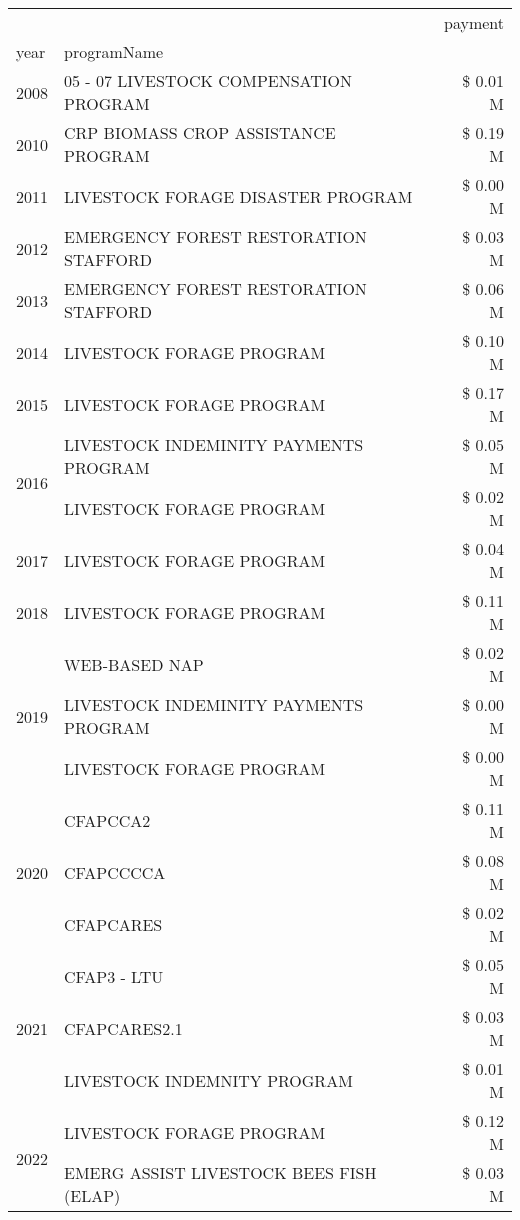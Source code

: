\begin{tabular}{llr}
\toprule
 &  & payment \\
year & programName &  \\
\midrule
2008 & 05 - 07 LIVESTOCK COMPENSATION PROGRAM & \$ 0.01 M \\
\cline{1-3}
2010 & CRP BIOMASS CROP ASSISTANCE PROGRAM & \$ 0.19 M \\
\cline{1-3}
2011 & LIVESTOCK FORAGE DISASTER PROGRAM & \$ 0.00 M \\
\cline{1-3}
2012 & EMERGENCY FOREST RESTORATION STAFFORD & \$ 0.03 M \\
\cline{1-3}
2013 & EMERGENCY FOREST RESTORATION STAFFORD & \$ 0.06 M \\
\cline{1-3}
2014 & LIVESTOCK FORAGE PROGRAM & \$ 0.10 M \\
\cline{1-3}
2015 & LIVESTOCK FORAGE PROGRAM & \$ 0.17 M \\
\cline{1-3}
\multirow[t]{2}{*}{2016} & LIVESTOCK INDEMINITY PAYMENTS PROGRAM & \$ 0.05 M \\
 & LIVESTOCK FORAGE PROGRAM & \$ 0.02 M \\
\cline{1-3}
2017 & LIVESTOCK FORAGE PROGRAM & \$ 0.04 M \\
\cline{1-3}
2018 & LIVESTOCK FORAGE PROGRAM & \$ 0.11 M \\
\cline{1-3}
\multirow[t]{3}{*}{2019} & WEB-BASED NAP & \$ 0.02 M \\
 & LIVESTOCK INDEMINITY PAYMENTS PROGRAM & \$ 0.00 M \\
 & LIVESTOCK FORAGE PROGRAM & \$ 0.00 M \\
\cline{1-3}
\multirow[t]{3}{*}{2020} & CFAPCCA2 & \$ 0.11 M \\
 & CFAPCCCCA & \$ 0.08 M \\
 & CFAPCARES & \$ 0.02 M \\
\cline{1-3}
\multirow[t]{3}{*}{2021} & CFAP3 - LTU & \$ 0.05 M \\
 & CFAPCARES2.1 & \$ 0.03 M \\
 & LIVESTOCK INDEMNITY PROGRAM & \$ 0.01 M \\
\cline{1-3}
\multirow[t]{2}{*}{2022} & LIVESTOCK FORAGE PROGRAM & \$ 0.12 M \\
 & EMERG ASSIST LIVESTOCK BEES FISH (ELAP) & \$ 0.03 M \\
\cline{1-3}
\bottomrule
\end{tabular}
